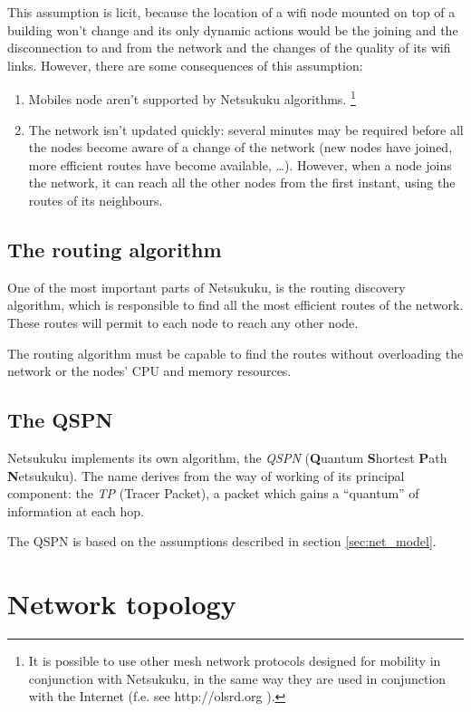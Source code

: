 \documentclass[a4paper]{article}
\newcommand{\href}[2]{ #1 }
\begin{document}
This assumption is licit, because the location of a wifi node mounted on
top of a building won't change and its only dynamic actions would be the
joining and the disconnection to and from the network and the changes of the
quality of its wifi links.
However, there are some consequences of this assumption:
\begin{enumerate}
	\item	Mobiles node aren't supported by Netsukuku algorithms.
		\footnote{It is possible to use other mesh network protocols
		designed for mobility in conjunction with Netsukuku, in the
		same way they are used in conjunction
		with the Internet (f.e. see \href{http://olsrd.org}{olsrd}). }
	\item   The network isn't updated quickly: several minutes may be
		required before all the nodes become aware of a change of the
		network (new nodes have joined, more efficient routes have
		become available, \dots). However, when a node joins
		the network, it can reach all the other nodes from the first
		instant, using the routes of its neighbours.
\end{enumerate}


\subsection{The routing algorithm}
One of the most important parts of Netsukuku, is the routing discovery
algorithm, which is responsible to find all the most efficient routes of the
network. These routes will permit to each node to reach any other node.

The routing algorithm must be capable to find the routes without overloading
the network or the nodes' CPU and memory resources.

\subsection{The QSPN}

Netsukuku implements its own algorithm, the \emph{QSPN} (\textbf{Q}uantum
\textbf{S}hortest \textbf{P}ath \textbf{N}etsukuku). The name derives from the
way of working of its principal component: the \emph{TP} (Tracer Packet), a
packet which gains a ``quantum'' of information at each hop.

The QSPN is based on the assumptions described in section \ref{sec:net_model}.

\section{Network topology}
\label{sec:net_topology}
\end{document}
